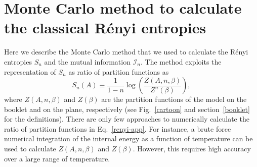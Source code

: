 \documentclass[twocolumn,superscriptaddress,prb,10pt]{revtex4-1}
\begin{document}
%

\section{Monte Carlo method to calculate the classical R\'enyi entropies}
\label{mc-method}

Here we describe the Monte Carlo method that we used to calculate the R\'enyi entropies 
$S_n$ and the mutual information ${\mathcal I}_n$. The method exploits the representation 
of $S_n$ as ratio of partition functions as 
%
\begin{equation}
\label{renyi-app}
S_n(A)\equiv \frac{1}{1-n}\log\left(\frac{Z(A,n,\beta)}{Z^n(\beta)}\right),
\end{equation}
%
where $Z(A,n,\beta)$ and $Z(\beta)$ are the partition functions of the model on the booklet and 
on the plane, respectively (see Fig.~\ref{cartoon} and section~\ref{booklet} for the definitions).  
There are only few approaches to numerically calculate the ratio of partition functions in 
Eq.~\eqref{renyi-app}. For instance, a brute force numerical integration of the internal energy as 
a function of temperature\cite{jaconis-2013} can be used to calculate $Z(A,n,\beta)$ and $Z(\beta)$. 
However, this requires high accuracy over a large range of temperature.
\end{document}
